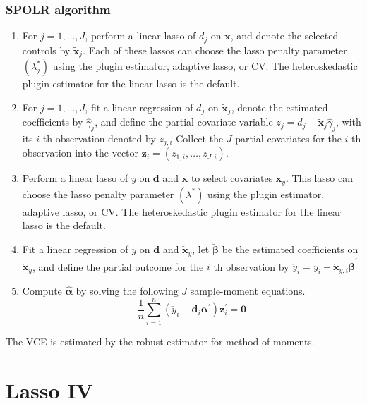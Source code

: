 {\subsubsection{SPOLR algorithm}
\begin{enumerate}
\item  For $j=1, \ldots, J$, perform a linear lasso of $d_{j}$ on $\mathbf{x}$, and denote the selected controls by $\widetilde{\mathbf{x}}_{j}$. Each of these lassos can choose the lasso penalty parameter $\left(\lambda_{j}^{*}\right)$ using the plugin estimator, adaptive lasso, or CV. The heteroskedastic plugin estimator for the linear lasso is the default.
\item  For $j=1, \ldots, J$, fit a linear regression of $d_{j}$ on $\widetilde{\mathbf{x}}_{j}$, denote the estimated coefficients by $\widehat{\gamma}_{j}$, and define the partial-covariate variable $z_{j}=d_{j}-\widetilde{\mathbf{x}}_{j} \widehat{\gamma}_{j}$, with its $i$ th observation denoted by $z_{j, i}$
Collect the $J$ partial covariates for the $i$ th observation into the vector $\mathbf{z}_{i}=\left(z_{1, i}, \ldots, z_{J, i}\right)$.
\item  Perform a linear lasso of $y$ on $\mathbf{d}$ and $\mathbf{x}$ to select covariates $\check{\mathbf{x}}_{y}$.
This lasso can choose the lasso penalty parameter $\left(\lambda^{*}\right)$ using the plugin estimator, adaptive lasso, or CV. The heteroskedastic plugin estimator for the linear lasso is the default.
\item  Fit a linear regression of $y$ on $\mathbf{d}$ and $\check{\mathbf{x}}_{y}$, let $\breve{\boldsymbol{\beta}}$ be the estimated coefficients on $\check{\mathbf{x}}_{y}$, and define the partial outcome for the $i$ th observation by $\check{y}_{i}=y_{i}-\check{\mathbf{x}}_{y, i} \breve{\boldsymbol{\beta}}^{\prime}$
\item  Compute $\widehat{\boldsymbol{\alpha}}$ by solving the following $J$ sample-moment equations.
$$
\frac{1}{n} \sum_{i=1}^{n}\left(\check{y}_{i}-\mathbf{d}_{i} \boldsymbol{\alpha}^{\prime}\right) \mathbf{z}_{i}^{\prime}=\mathbf{0}
$$
\end{enumerate}
The VCE is estimated by the robust estimator for method of moments.

\fi      %





\iffalse %
\section{Lasso IV}\label{sec:lassoIV}
}
